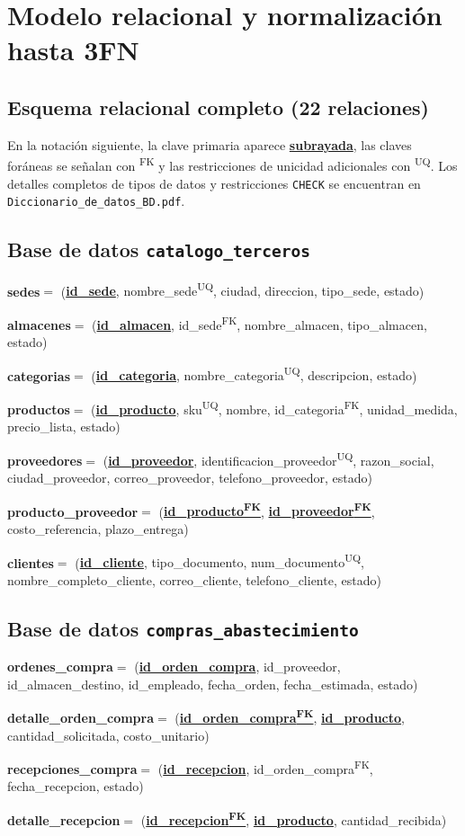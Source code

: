 \documentclass[11pt,oneside]{article}
\newcommand{\rel}[2]{%
  \par\vspace{0.28em}%
  {\raggedright\noindent
   {\ttfamily\small\bfseries\color{acento}#1}\enspace$=$%
   \enspace({\ttfamily\small #2})\par}}
\newcommand{\rpk}[1]{\underline{\textbf{#1}}}
\newcommand{\rfk}[1]{\textcolor{fk}{#1}\textsuperscript{\scriptsize\sffamily FK}}
\newcommand{\ruq}[1]{#1\textsuperscript{\scriptsize\sffamily UQ}}
\begin{document}
\section{Modelo relacional y normalizaci\'on hasta 3FN}

\subsection{Esquema relacional completo (22 relaciones)}

En la notaci\'on siguiente, la clave primaria aparece \rpk{subrayada}, las
claves for\'aneas se se\~nalan con \textsuperscript{\scriptsize\sffamily FK}
y las restricciones de unicidad adicionales con
\textsuperscript{\scriptsize\sffamily UQ}. Los detalles completos de tipos de
datos y restricciones \texttt{CHECK} se encuentran en
\texttt{Diccionario\_de\_datos\_BD.pdf}.

\subsection*{Base de datos \texttt{catalogo\_terceros}}
\rel{sedes}{\rpk{id\_sede}, \ruq{nombre\_sede}, ciudad, direccion, tipo\_sede, estado}
\rel{almacenes}{\rpk{id\_almacen}, \rfk{id\_sede}, nombre\_almacen, tipo\_almacen, estado}
\rel{categorias}{\rpk{id\_categoria}, \ruq{nombre\_categoria}, descripcion, estado}
\rel{productos}{\rpk{id\_producto}, \ruq{sku}, nombre, \rfk{id\_categoria}, unidad\_medida, precio\_lista, estado}
\rel{proveedores}{\rpk{id\_proveedor}, \ruq{identificacion\_proveedor}, razon\_social, ciudad\_proveedor, correo\_proveedor, telefono\_proveedor, estado}
\rel{producto\_proveedor}{\rpk{\rfk{id\_producto}}, \rpk{\rfk{id\_proveedor}}, costo\_referencia, plazo\_entrega}
\rel{clientes}{\rpk{id\_cliente}, tipo\_documento, \ruq{num\_documento}, nombre\_completo\_cliente, correo\_cliente, telefono\_cliente, estado}

\subsection*{Base de datos \texttt{compras\_abastecimiento}}
\rel{ordenes\_compra}{\rpk{id\_orden\_compra}, id\_proveedor, id\_almacen\_destino, id\_empleado, fecha\_orden, fecha\_estimada, estado}
\rel{detalle\_orden\_compra}{\rpk{\rfk{id\_orden\_compra}}, \rpk{id\_producto}, cantidad\_solicitada, costo\_unitario}
\rel{recepciones\_compra}{\rpk{id\_recepcion}, \rfk{id\_orden\_compra}, fecha\_recepcion, estado}
\rel{detalle\_recepcion}{\rpk{\rfk{id\_recepcion}}, \rpk{id\_producto}, cantidad\_recibida}
\end{document}
